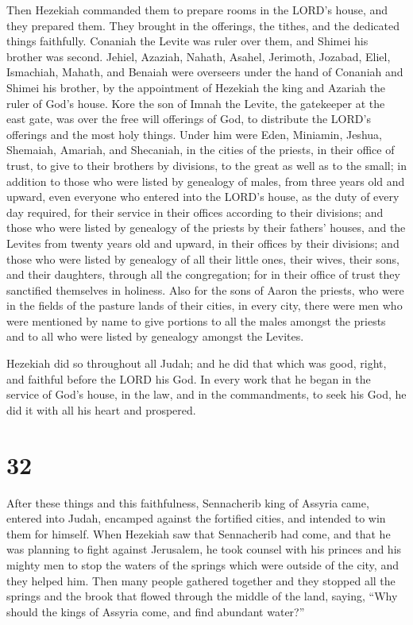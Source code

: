  Then Hezekiah commanded them to prepare rooms in the
LORD's house, and they prepared them.  They brought in the
offerings, the tithes, and the dedicated things faithfully. Conaniah the
Levite was ruler over them, and Shimei his brother was second.
 Jehiel, Azaziah, Nahath, Asahel, Jerimoth, Jozabad, Eliel,
Ismachiah, Mahath, and Benaiah were overseers under the hand of Conaniah
and Shimei his brother, by the appointment of Hezekiah the king and
Azariah the ruler of God's house.  Kore the son of Imnah
the Levite, the gatekeeper at the east gate, was over the free will
offerings of God, to distribute the LORD's offerings and the most holy
things.  Under him were Eden, Miniamin, Jeshua, Shemaiah,
Amariah, and Shecaniah, in the cities of the priests, in their office of
trust, to give to their brothers by divisions, to the great as well as
to the small;  in addition to those who were listed by
genealogy of males, from three years old and upward, even everyone who
entered into the LORD's house, as the duty of every day required, for
their service in their offices according to their divisions;
 and those who were listed by genealogy of the priests by
their fathers' houses, and the Levites from twenty years old and upward,
in their offices by their divisions;  and those who were
listed by genealogy of all their little ones, their wives, their sons,
and their daughters, through all the congregation; for in their office
of trust they sanctified themselves in holiness.  Also for
the sons of Aaron the priests, who were in the fields of the pasture
lands of their cities, in every city, there were men who were mentioned
by name to give portions to all the males amongst the priests and to all
who were listed by genealogy amongst the Levites.

 Hezekiah did so throughout all Judah; and he did that
which was good, right, and faithful before the LORD his God.
 In every work that he began in the service of God's house,
in the law, and in the commandments, to seek his God, he did it with all
his heart and prospered.

\hypertarget{section-31}{%
\section{32}\label{section-31}}

 After these things and this faithfulness, Sennacherib king
of Assyria came, entered into Judah, encamped against the fortified
cities, and intended to win them for himself.  When Hezekiah
saw that Sennacherib had come, and that he was planning to fight against
Jerusalem,  he took counsel with his princes and his mighty
men to stop the waters of the springs which were outside of the city,
and they helped him.  Then many people gathered together and
they stopped all the springs and the brook that flowed through the
middle of the land, saying, ``Why should the kings of Assyria come, and
find abundant water?''

